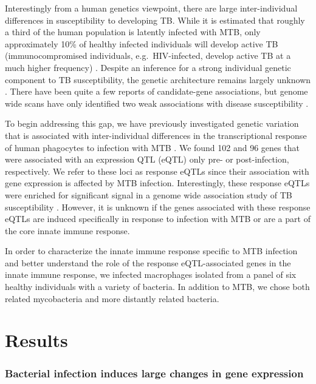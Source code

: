 Interestingly from a human genetics viewpoint, there are large
inter-individual differences in susceptibility to developing TB. While
it is estimated that roughly a third of the human population is latently
infected with MTB, only approximately 10\% of healthy infected
individuals will develop active TB (immunocompromised individuals,
e.g.~HIV-infected, develop active TB at a much higher frequency)
\citep{North2004}. Despite an inference for a strong individual genetic
component to TB susceptibility, the genetic architecture remains largely
unknown \citep{KALLMANN01091943, Comstock1978, Cobat2010, Moller2010}.
There have been quite a few reports of candidate-gene associations, but
genome wide scans have only identified two weak associations with
disease susceptibility \citep{Thye2010, Yim2010, Thye2012}.

To begin addressing this gap, we have previously investigated genetic
variation that is associated with inter-individual differences in the
transcriptional response of human phagocytes to infection with MTB
\citep{Barreiro2012}. We found 102 and 96 genes that were associated with
an expression QTL (eQTL) only pre- or post-infection, respectively. We
refer to these loci as response eQTLs since their association with gene
expression is affected by MTB infection. Interestingly, these response
eQTLs were enriched for significant signal in a genome wide association
study of TB susceptibility \citep{Thye2010}. However, it is unknown if
the genes associated with these response eQTLs are induced specifically
in response to infection with MTB or are a part of the core innate
immune response.

In order to characterize the innate immune response specific to MTB
infection and better understand the role of the response eQTL-associated
genes in the innate immune response, we infected macrophages isolated
from a panel of six healthy individuals with a variety of bacteria. In
addition to MTB, we chose both related mycobacteria and more distantly
related bacteria.

\section{Results}\label{results}

\subsubsection{Bacterial infection induces large changes in gene
expression}\label{bacterial-infection-induces-large-changes-in-gene-expression}


